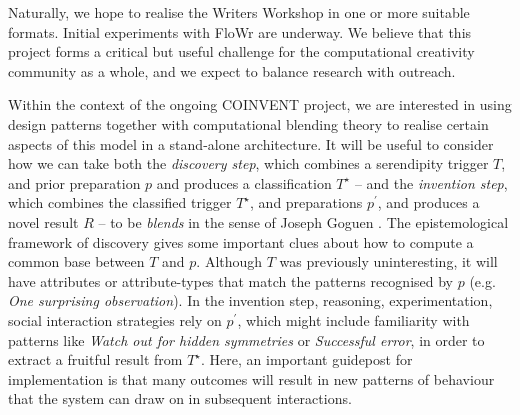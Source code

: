 Naturally, we hope to realise the Writers Workshop in one or more
suitable formats.  Initial experiments with {\sf FloWr} are underway.
We believe that this project forms a critical but useful challenge for
the computational creativity community as a whole, and we expect to
balance research with outreach.

Within the context of the ongoing COINVENT project, we are interested
in using design patterns together with computational blending theory
to realise certain aspects of this model in a stand-alone
architecture.
%
It will be useful to consider how we can take both the \emph{discovery
  step}, which combines a serendipity trigger $T$, and prior
preparation $p$ and produces a classification $T^{\star}$ -- and the
\emph{invention step}, which combines the classified trigger
$T^{\star}$, and preparations $p^{\prime}$, and produces a novel
result $R$ -- to be \emph{blends} in the sense of Joseph Goguen
\cite{goguen1999introduction}.  The epistemological framework of
discovery gives some important clues about how to compute a common
base between $T$ and $p$.  Although $T$ was previously uninteresting,
it will have attributes or attribute-types that match the patterns
recognised by $p$ (e.g. \emph{One surprising observation}).  In the
invention step, reasoning, experimentation, social interaction
strategies rely on $p^{\prime}$, which might include familiarity with
patterns like \emph{Watch out for hidden symmetries} or
\emph{Successful error}, in order to extract a fruitful result from
$T^{\star}$.  Here, an important guidepost for implementation is that
many outcomes will result in new patterns of behaviour that the system
can draw on in subsequent interactions.

